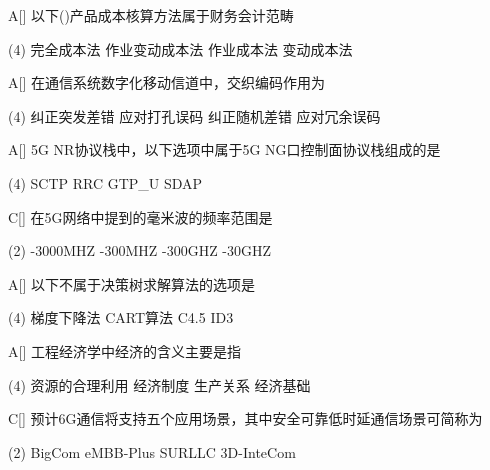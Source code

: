 \begin{choice}{A}[]
    以下(\quad)产品成本核算方法属于财务会计范畴
    \begin{tasks}(4)
        \task 完全成本法
        \task 作业变动成本法
        \task 作业成本法
        \task 变动成本法
    \end{tasks}
\end{choice}


\begin{choice}{A}[]
    在通信系统数字化移动信道中，交织编码作用为
    \begin{tasks}(4)
        \task 纠正突发差错
        \task 应对打孔误码
        \task 纠正随机差错
        \task 应对冗余误码
    \end{tasks}
\end{choice}

\begin{choice}{A}[]
    5G NR协议栈中，以下选项中属于5G NG口控制面协议栈组成的是
    \begin{tasks}(4)
        \task SCTP
        \task RRC
        \task GTP\_U
        \task SDAP
    \end{tasks}
\end{choice}




\begin{choice}{C}[]
    在5G网络中提到的毫米波的频率范围是
    \begin{tasks}(2)
        -3000MHZ
        -300MHZ
        -300GHZ
        -30GHZ
    \end{tasks}
\end{choice}


\begin{choice}{A}[]
    以下不属于决策树求解算法的选项是
    \begin{tasks}(4)
        \task 梯度下降法
        \task CART算法
        \task C4.5
        \task ID3
    \end{tasks}
\end{choice}


\begin{choice}{A}[]
    工程经济学中经济的含义主要是指
    \begin{tasks}(4)
        \task 资源的合理利用
        \task 经济制度
        \task 生产关系
        \task 经济基础
    \end{tasks}
\end{choice}


\begin{choice}{C}[]
    预计6G通信将支持五个应用场景，其中安全可靠低时延通信场景可简称为
    \begin{tasks}(2)
        \task BigCom
        \task eMBB-Plus
        \task SURLLC
        \task 3D-InteCom
    \end{tasks}
\end{choice}

